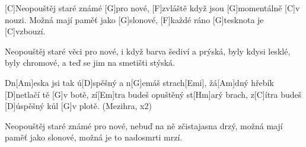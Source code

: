 
[C]Neopouštěj staré známé [G]pro nové,
[F]zvláště když jsou [G]momentálně [C]v nouzi.
Možná mají paměť jako [G]slonové,
[F]každé ráno [G]tesknota je [C]vzbouzí.

Neopouštěj staré věci pro nové,
i když barva šediví a prýská,
byly kdysi lesklé, byly chromové,
a teď se jim na smetišti stýská.

Dn[Am]eska jsi tak ú[D]spěšný a n[G]emáš strach[Emi],
žá[Am]dný hřebík [D]netlačí tě [G]v botě,
zí[Em]tra budeš opuštěný st[Hm]arý brach,
z[C]\null ítra budeš [D]\null úspěšný kůl [G]v plotě. (Mezihra, x2)

Neopouštěj staré známé pro nové,
nebuď na ně zčistajasna drzý,
možná mají paměť jako slonové,
možná je to nadosmrti mrzí.
\slpc





